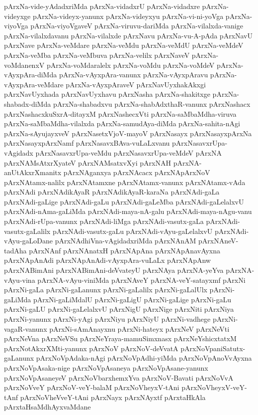 {pArxNa-vide-yAdadxriMda
pArxNa-vidadxrU
pArxNa-vidadxre
pArxNa-videyxge
pArxNa-videyx-yanunx
pArxNa-videyxyu
pArxNa-vi-ni-yoVga
pArxNa-viyoVga
pArxNa-viyoVgaveV
pArxNa-viruvu-dariMda
pArxNa-vilalxda-vanige
pArxNa-vilalxdavanu
pArxNa-vilalxde
pArxNavu
pArxNa-vu-A-pAda
pArxNavU
pArxNave
pArxNa-veMdare
pArxNa-veMdu
pArxNa-veMdU
pArxNa-veMdeV
pArxNa-veMba
pArxNa-veMbuva
pArxNa-velilx
pArxNaveV
pArxNa-voMdanenxV
pArxNa-voMdaralelx
pArxNa-voMdu
pArxNa-voMdeV
pArxNa-vAyxpAra-diMda
pArxNa-vAyxpAra-vanunx
pArxNa-vAyxpAravu
pArxNa-vAyxpAra-veMdare
pArxNa-vAyxpAraveV
pArxNavUyxhakAkxgi
pArxNavUyxhada
pArxNavUyxhavu
pArxNasha
pArxNa-shakitxge
pArxNa-shabadx-diMda
pArxNa-shabadxvu
pArxNa-shabAdxthaR-vanunx
pArxNashacx
pArxNashacxkuSxrA-ditayxM
pArxNashecxVti
pArxNa-saMbaMdha-viruva
pArxNa-saMbaMdha-vilalxda
pArxNa-samudAya-diMda
pArxNa-sahita-nAgi
pArxNa-sAyujayxveV
pArxNasetxVjoV-mayoV
pArxNasayx
pArxNasayxpArxNa
pArxNasayxpArxNamf
pArxNasavxBAva-vuLaLxvanu
pArxNasavxrUpa-vAgidadx
pArxNasavxrUpa-veMdu
pArxNasavxrUpa-veMdeV
pArxNA
pArxNAMsAtxrXyateV
pArxNAMsatxvXyi
pArxNAH
pArxNA-anUtAkxrXmanitx
pArxNAganxya
pArxNAcacx
pArxNApArxNoV
pArxNAtamx-nalilx
pArxNAtamxne
pArxNAtamx-vanunx
pArxNAtamx-vAda
pArxNAdi
pArxNAdikAyaR
pArxNAdikAyaR-karaNa
pArxNAdi-gaLa
pArxNAdi-gaLige
pArxNAdi-gaLu
pArxNAdi-gaLeMba
pArxNAdi-gaLelalxvU
pArxNAdi-nAma-gaLiMda
pArxNAdi-maya-nA-galu
pArxNAdi-maya-nAgu-vanu
pArxNAdi-rUpa-vanunx
pArxNAdi-liMga
pArxNAdi-vasutx-gaLa
pArxNAdi-vasutx-gaLalilx
pArxNAdi-vasutx-gaLu
pArxNAdi-vAyu-gaLelalxvU
pArxNAdi-vAyu-gaLoDane
pArxNAdhiVna-vAgidadxriMda
pArxNAnAM
pArxNAneV-tadAha
pArxNAnf
pArxNAnatxH
pArxNApAna
pArxNApAnavAyxna
pArxNApAnAdi
pArxNApAnAdi-vAyxpAra-vuLaLx
pArxNApAnw
pArxNABimAni
pArxNABimAni-deVvateyU
pArxNAya
pArxNA-yeYva
pArxNA-vAyu-vina
pArxNA-vAyu-viniMda
pArxNAveY
pArxNA-veY-satayxmf
pArxNi
pArxNi-gaLa
pArxNi-gaLanunx
pArxNi-gaLalilx
pArxNi-gaLalUlx
pArxNi-gaLiMda
pArxNi-gaLiMdalU
pArxNi-gaLigU
pArxNi-gaLige
pArxNi-gaLu
pArxNi-gaLU
pArxNi-gaLelalxvU
pArxNigU
pArxNige
pArxNiti
pArxNiya
pArxNi-yanunx
pArxNi-yAgi
pArxNiyu
pArxNiyU
pArxNi-vadhege
pArxNi-vagaR-vanunx
pArxNi-sAmAnayxnu
pArxNi-hateyx
pArxNeV
pArxNeVti
pArxNeVna
pArxNeVSu
pArxNeYraya-mamuSimxnasx
pArxNeYshicxtatxM
pArxNotAkxrXMti-yanunx
pArxNoV
pArxNoV-deVvatA
pArxNoVpaniSatutx-gaLanunx
pArxNoVpAdaka-nAgi
pArxNoVpAdhi-yiMda
pArxNoVpAnoVvAyxna
pArxNoVpAsaka-nige
pArxNoVpAsaneya
pArxNoVpAsane-yanunx
pArxNoVpAsaneyeV
pArxNoVbarxhemxYva
pArxNoV-Bavati
pArxNoVvA
pArxNoVveY
pArxNoV-veY-balaM
pArxNoVheyxV-tAni
pArxNoVheyxV-veY-tAnf
pArxNoVheVveY-tAni
pArxNayx
pArxNAyxtf
pArxtaHkAla
pArxtaHsaMdhAyxvaMdane
}
